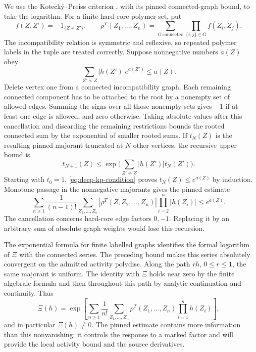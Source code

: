 \documentclass[11pt,letterpaper,reqno]{amsart}
\theoremstyle{definition}
\theoremstyle{remark}
\begin{document}
We use the Koteck\'y--Preiss criterion \cite{KoteckyPreiss1986},
with its pinned connected-graph bound, to take the logarithm.
For a finite hard-core polymer set, put
\[
 f(Z,Z')=-1_{\{Z\nsim Z'\}},\qquad
 \rho^T(Z_1,\ldots,Z_n)
   =\sum_{G\ \mathrm{connected}}\prod_{\{i,j\}\in G}f(Z_i,Z_j).
\]
The incompatibility relation is symmetric and reflexive, so
repeated polymer labels in the tuple are treated correctly.
Suppose nonnegative numbers $a(Z)$ obey
\begin{equation}\label{eq:deep-kp-condition}
 \sum_{Z'\nsim Z}|h(Z')|e^{a(Z')}\le a(Z).
\end{equation}
Delete vertex one from a connected incompatibility graph.
Each remaining connected component has to be attached to the
root by a nonempty set of allowed edges. Summing the signs over
all those nonempty sets gives $-1$ if at least one edge is
allowed, and zero otherwise. Taking absolute values after this
cancellation and discarding the remaining restrictions bounds
the rooted connected sum by the exponential of smaller rooted
sums. If $t_N(Z)$ is the resulting pinned majorant truncated at
$N$ other vertices, the recursive upper bound is
\[
 t_{N+1}(Z)
       \le\exp\Big(\sum_{Z'\nsim Z}|h(Z')|t_N(Z')\Big).
\]
Starting with $t_0=1$, \eqref{eq:deep-kp-condition} proves
$t_N(Z)\le e^{a(Z)}$ by induction. Monotone passage in the
nonnegative majorants gives the pinned estimate
\begin{equation}\label{eq:deep-pinned-bound}
 \sum_{n\ge1}\frac1{(n-1)!}
  \sum_{Z_2,\ldots,Z_n}|\rho^T(Z,Z_2,\ldots,Z_n)|
                        \prod_{i=2}^n|h(Z_i)|\le e^{a(Z)}.
\end{equation}
The cancellation concerns hard-core edge factors $0,-1$.
Replacing it by an arbitrary sum of absolute graph weights
would lose this recursion.

The exponential formula for finite labelled graphs identifies
the formal logarithm of $\Xi$ with the connected series.
The preceding bound makes this series absolutely convergent
on the admitted activity polydisc. Along the path $rh$,
$0\le r\le1$, the same majorant is uniform. The identity with
$\Xi$ holds near zero by the finite algebraic formula and then
throughout this path by analytic continuation and continuity.
Thus
\begin{equation}\label{eq:deep-connected-log}
 \Xi(h)=\exp\left[
  \sum_{n\ge1}\frac1{n!}
       \sum_{Z_1,\ldots,Z_n}\rho^T(Z_1,\ldots,Z_n)
                                      \prod_{i=1}^nh(Z_i)\right],
\end{equation}
and in particular $\Xi(h)\ne0$. The pinned estimate contains
more information than this nonvanishing: it controls the
response to a marked factor and will provide the local
activity bound and the source derivatives.
\end{document}
